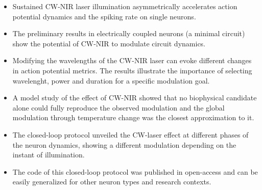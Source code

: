 \begin{itemize}
     \begin{itemize}
         \item Sustained CW-NIR laser illumination asymmetrically accelerates action potential dynamics and the spiking rate on single neurons.
         \item The preliminary results in electrically coupled neurons (a minimal circuit) show the potential of CW-NIR to modulate circuit dynamics.
         \item    Modifying the wavelengths of the CW-NIR laser can evoke different changes in action potential metrics. The results illustrate the importance of selecting  wavelenght, power and duration for a specific modulation goal.
         \item A model study of the effect of CW-NIR showed that no biophysical candidate alone could fully reproduce the observed modulation and the global modulation through temperature change was the closest approximation to it.
         \item The closed-loop protocol unveiled the CW-laser effect at different phases of the neuron dynamics, showing a different modulation depending on the instant of illumination.
         \item The code of this closed-loop protocol was published in open-access and can be easily generalized for other neuron types and research contexts.
     \end{itemize}
\end{itemize}
